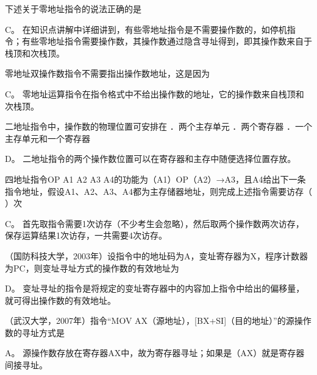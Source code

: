 \question 下述关于零地址指令的说法正确的是
\par{}
\begin{solution}C。
在知识点讲解中详细讲到，有些零地址指令是不需要操作数的，如停机指令；有些零地址指令需要操作数，其操作数通过隐含寻址得到，即其操作数来自于栈顶和次栈顶。
\end{solution}
\question 零地址双操作数指令不需要指出操作数地址，这是因为
\par{}
\begin{solution}C。
零地址运算指令在指令格式中不给出操作数的地址，它的操作数来自栈顶和次栈顶。
\end{solution}
\question 二地址指令中，操作数的物理位置可安排在 ．两个主存单元 ．两个寄存器
．一个主存单元和一个寄存器
\par{}
\begin{solution}D。 二地址指令的两个操作数位置可以在寄存器和主存中随便选择位置存放。
\end{solution}
\question 四地址指令OP A1 A2 A3
A4的功能为（A1）OP（A2）→A3，且A4给出下一条指令地址，假设A1、A2、A3、A4都为主存储器地址，则完成上述指令需要访存（
）次
\par{}
\begin{solution}C。
首先取指令需要1次访存（不少考生会忽略），然后取两个操作数两次访存，保存运算结果1次访存，一共需要4次访存。
\end{solution}
\question （国防科技大学，2003年）设指令中的地址码为A，变址寄存器为X，程序计数器为PC，则变址寻址方式的操作数的有效地址为
\par{}
\begin{solution}D。
变址寻址的指令是将规定的变址寄存器中的内容加上指令中给出的偏移量，就可得出操作数的有效地址。
\end{solution}
\question （武汉大学，2007年）指令``MOV
AX（源地址），{[}BX+SI{]}（目的地址）''的源操作数的寻址方式是
\par{}
\begin{solution}A。
源操作数存放在寄存器AX中，故为寄存器寻址；如果是（AX）就是寄存器间接寻址。
\end{solution}
